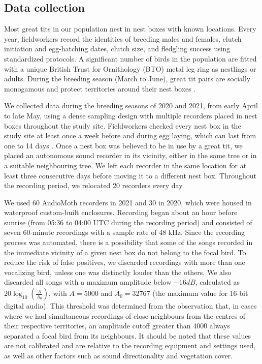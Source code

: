 \subsection{Data collection}
Most great tits in our population nest in nest boxes with known locations. Every year, fieldworkers record the identities of breeding males and females, clutch initiation and egg-hatching dates, clutch size, and fledgling success using standardized protocols. A significant number of birds in the population are fitted with a unique British Trust for Ornithology (BTO) metal leg ring as nestlings or adults. During the breeding season (March to June), great tit pairs are socially monogamous and protect territories around their nest boxes \parencite{hinde1952}.

We collected data during the breeding seasons of 2020 and 2021, from early April to late May, using a dense sampling design with multiple recorders placed in nest boxes throughout the study site. Fieldworkers checked every nest box in the study site at least once a week before and during egg laying, which can last from one to 14 days \parencite{Perrins1965}. Once a nest box was believed to be in use by a great tit, we placed an autonomous sound recorder in its vicinity, either in the same tree or in a suitable neighbouring tree. We left each recorder in the same location for at least three consecutive days before moving it to a different nest box. Throughout the recording period, we relocated 20 recorders every day.

We used 60 AudioMoth recorders \parencite{hill2019} in 2021 and 30 in 2020, which were housed in waterproof custom-built enclosures. Recording began about an hour before sunrise (from 05:36 to 04:00 UTC during the recording period) and consisted of seven 60-minute recordings with a sample rate of 48 kHz. Since the recording process was automated, there is a possibility that some of the songs recorded in the immediate vicinity of a given nest box do not belong to the focal bird. To reduce the risk of false positives, we discarded recordings with more than one vocalizing bird, unless one was distinctly louder than the others. We also discarded all songs with a maximum amplitude below $-16 dB$, calculated as $20\log_{10} \left (\frac{A}{A_{0}}\right )$, with $A = 5000$ and $A_{0} = 32767$ (the maximum value for 16-bit digital audio). This threshold was determined from the observation that, in cases where we had simultaneous recordings of close neighbours from the centres of their respective territories, an amplitude cutoff greater than 4000 always separated a focal bird from its neighbours. It should be noted that these values are not calibrated and are relative to the recording equipment and settings used, as well as other factors such as sound directionality and vegetation cover.

